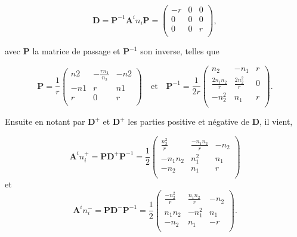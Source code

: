 \documentclass[a4paper,oneside,10pt]{report}
\begin{document}
\begin{equation}
\mathbf{D} =\mathbf{P}^{-1}\mathbf{A}^in_i\mathbf{P}=
\begin{pmatrix}
-r & 0 &0 \\
0& 0 & 0\\
0 & 0 & r\\
\end{pmatrix},
\end{equation}

avec $\mathbf{P}$ la matrice de passage et $\mathbf{P}^{-1}$ son inverse, telles que

\begin{equation}
\mathbf{P}=\frac{1}{r}
\begin{pmatrix}
n2 & -\frac{rn_1}{n_2} &-n2\\
-n1 & r & n1\\
r & 0 & r\\
\end{pmatrix}
\quad \mbox{et} \quad
\mathbf{P}^{-1}=\frac{1}{2r}
\begin{pmatrix}
n_2 & -n_1 &r\\
\frac{2n_1n_2}{r} & \frac{2n_2^2}{r} & 0\\
-n_2^2 & n_1 & r\\
\end{pmatrix}.
\end{equation}

Ensuite en notant par $\mathbf{D}^+$ et $\mathbf{D}^+$ les parties positive et négative de $\mathbf{D}$, il vient,

\begin{equation}
\mathbf{A}^in_i^+= \mathbf{P}\mathbf{D}^+\mathbf{P}^{-1} = \frac{1}{2}
\begin{pmatrix}
\frac{n_2^2}{r} & \frac{-n_1n_2}{r}  & -n_2 \\
-n_1n_2& n_1^2 & n_1\\
-n_2& n_1 & r\\
\end{pmatrix}
\end{equation}
et
\begin{equation}
\mathbf{A}^in_i^-= \mathbf{P}\mathbf{D}^-\mathbf{P}^{-1} = \frac{1}{2}
\begin{pmatrix}
\frac{-n_2^2}{r} & \frac{n_1n_2}{r}  & -n_2 \\
n_1n_2& -n_1^2 & n_1\\
-n_2& n_1 & -r\\
\end{pmatrix}.
\end{equation}





\end{document}
